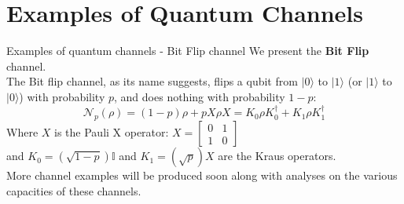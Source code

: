 \section{Examples of Quantum Channels}

\begin{frame}{Examples of quantum channels - Bit Flip channel}
    We present the \textbf{Bit Flip} channel.\\
    The Bit flip channel, as its name suggests, flips a qubit from $|0\rangle $ to $|1\rangle $ (or $|1\rangle $ to $|0\rangle $) with probability $p$, and
    does nothing with probability $1-p$:
    \begin{equation}
        \mathcal{N}_p(\rho) = (1-p)\rho + pX\rho X = K_0 \rho K_0^\dagger + K_1 \rho K_1^\dagger
    \end{equation}
    Where $X$ is the Pauli X operator:
    \begin{math}
        X = \begin{bmatrix}
            0 & 1\\
            1 & 0
        \end{bmatrix}
    \end{math}\\
    and $K_0 = (\sqrt{1-p})\mathbb{I} $ and $K_1 = (\sqrt{p})X$ are the Kraus operators.\\

    More channel examples will be produced soon along with analyses on the various capacities of these channels.
\end{frame}

